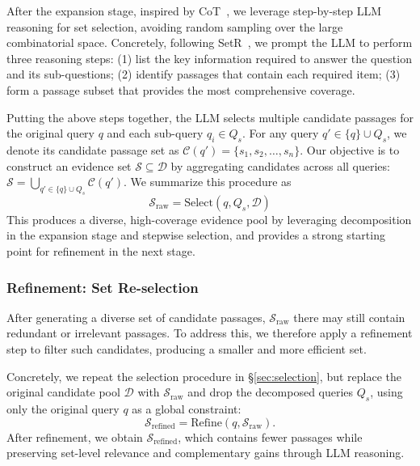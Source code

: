 \documentclass[11pt]{article}
\begin{document}
After the expansion stage, inspired by CoT~\citep{wei2022chain}, we leverage step-by-step LLM reasoning for set selection, avoiding random sampling over the large combinatorial space. 
Concretely, following SetR~\citep{lee2025shifting}, we prompt the LLM to perform three reasoning steps: (1) list the key information required to answer the question and its sub-questions; (2) identify passages that contain each required item; (3) form a passage subset that provides the most comprehensive coverage. 

Putting the above steps together, the LLM selects multiple candidate passages for the original query \(q\) and each sub-query \(q_i \in Q_s\). For any query \(q'\in \{q\}\cup Q_s\), we denote its candidate passage set as
\(\mathcal{C}(q')=\{s_1,s_2,\dots,s_n\}\).
Our objective is to construct an evidence set \(\mathcal{S}\subseteq\mathcal{D}\) by aggregating candidates across all queries:
\(\mathcal{S}=\bigcup_{q' \in \{q\}\cup Q_s}\mathcal{C}(q')\).
We summarize this procedure as
\begin{equation}
\label{eq:Selection}
    \mathcal{S}_\text{raw} = \text{Select}(q, Q_s,\mathcal{D})
\end{equation}
This produces a diverse, high-coverage evidence pool by leveraging decomposition in the expansion stage and stepwise selection, and provides a strong starting point for refinement in the next stage. 


\subsubsection{Refinement: Set Re-selection}
After generating a diverse set of candidate passages, \(\mathcal{S}_{\text{raw}}\) there may still contain redundant or irrelevant passages. To address this, we therefore apply a refinement step to filter such candidates, producing a smaller and more efficient set. 

Concretely, we repeat the selection procedure in \S\ref{sec:selection}, but replace the original candidate pool \(\mathcal{D}\) with \(\mathcal{S}_{\text{raw}}\) and drop the decomposed queries \(Q_s\), using only the original query \(q\) as a global constraint: 
\begin{equation}
\label{eq:Refinement}
    \mathcal{S}_\text{refined} = \text{Refine}(q, \mathcal{S}_\text{raw}).
\end{equation}
After refinement, we obtain \(\mathcal{S}_\text{refined}\), which contains fewer passages while preserving set-level relevance and complementary gains through LLM reasoning. 
\end{document}
